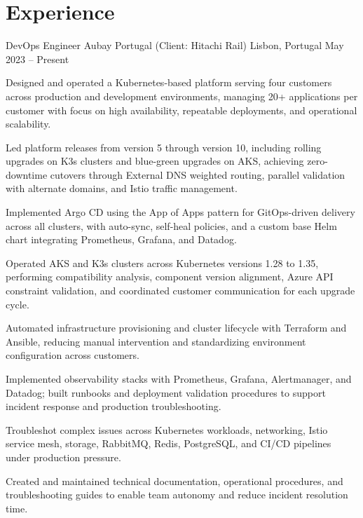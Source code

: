 \section*{Experience}

\experience
  {DevOps Engineer}
  {Aubay Portugal (Client: Hitachi Rail)}
  {Lisbon, Portugal}
  {May 2023 -- Present}
  {
    \item Designed and operated a Kubernetes-based platform serving four customers across production and development environments, managing 20+ applications per customer with focus on high availability, repeatable deployments, and operational scalability.
    \item Led platform releases from version 5 through version 10, including rolling upgrades on K3s clusters and blue-green upgrades on AKS, achieving zero-downtime cutovers through External DNS weighted routing, parallel validation with alternate domains, and Istio traffic management.
    \item Implemented Argo CD using the App of Apps pattern for GitOps-driven delivery across all clusters, with auto-sync, self-heal policies, and a custom base Helm chart integrating Prometheus, Grafana, and Datadog.
    \item Operated AKS and K3s clusters across Kubernetes versions 1.28 to 1.35, performing compatibility analysis, component version alignment, Azure API constraint validation, and coordinated customer communication for each upgrade cycle.
    \item Automated infrastructure provisioning and cluster lifecycle with Terraform and Ansible, reducing manual intervention and standardizing environment configuration across customers.
    \item Implemented observability stacks with Prometheus, Grafana, Alertmanager, and Datadog; built runbooks and deployment validation procedures to support incident response and production troubleshooting.
    \item Troubleshot complex issues across Kubernetes workloads, networking, Istio service mesh, storage, RabbitMQ, Redis, PostgreSQL, and CI/CD pipelines under production pressure.
    \item Created and maintained technical documentation, operational procedures, and troubleshooting guides to enable team autonomy and reduce incident resolution time.
  }

